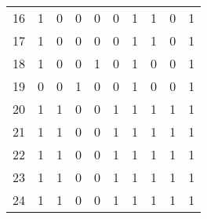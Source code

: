 \begin{longtable}{lrrrrrrrrr}
16    &                          1 &                             0 &                          0 &                        0 &                           0 &                        1 &                         1 &                            0 &                         1 \\
17    &                          1 &                             0 &                          0 &                        0 &                           0 &                        1 &                         1 &                            0 &                         1 \\
18    &                          1 &                             0 &                          0 &                        1 &                           0 &                        1 &                         0 &                            0 &                         1 \\
19    &                          0 &                             0 &                          1 &                        0 &                           0 &                        1 &                         0 &                            0 &                         1 \\
20    &                          1 &                             1 &                          0 &                        0 &                           1 &                        1 &                         1 &                            1 &                         1 \\
21    &                          1 &                             1 &                          0 &                        0 &                           1 &                        1 &                         1 &                            1 &                         1 \\
22    &                          1 &                             1 &                          0 &                        0 &                           1 &                        1 &                         1 &                            1 &                         1 \\
23    &                          1 &                             1 &                          0 &                        0 &                           1 &                        1 &                         1 &                            1 &                         1 \\
24    &                          1 &                             1 &                          0 &                        0 &                           1 &                        1 &                         1 &                            1 &                         1 \\

\end{longtable}
